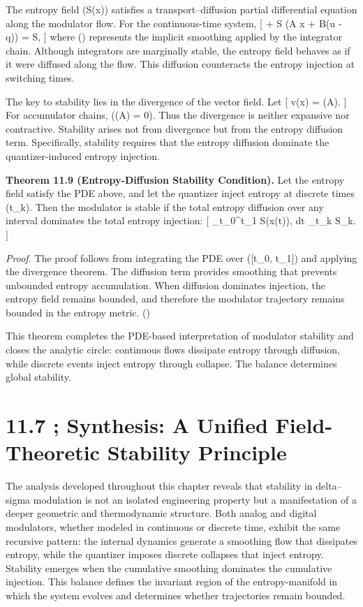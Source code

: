 The entropy field (S(x)) satisfies a transport–diffusion partial differential equation along the modulator flow. For the continuous-time system,
[
 + \nabla S \cdot (A x + B(u - q)) = \kappa \Delta S,
]
where (\kappa) represents the implicit smoothing applied by the integrator chain. Although integrators are marginally stable, the entropy field behaves as if it were diffused along the flow. This diffusion counteracts the entropy injection at switching times.

The key to stability lies in the divergence of the vector field. Let
[
\nabla \cdot v(x) = (A).
]
For accumulator chains, ((A) = 0). Thus the divergence is neither expansive nor contractive. Stability arises not from divergence but from the entropy diffusion term. Specifically, stability requires that the entropy diffusion dominate the quantizer-induced entropy injection.

\textbf{Theorem 11.9 (Entropy-Diffusion Stability Condition).}
Let the entropy field satisfy the PDE above, and let the quantizer inject entropy at discrete times (t_{k}). Then the modulator is stable if the total entropy diffusion over any interval dominates the total entropy injection:
[
\int_{t_{0}}^{t_{1}} \kappa \Delta S(x(t)), dt \ge \sum_{t_{k} \in [t_{0}, t_{1}]} \Delta S_{k}.
]

\textit{Proof.}
The proof follows from integrating the PDE over ([t_{0}, t_{1}]) and applying the divergence theorem. The diffusion term provides smoothing that prevents unbounded entropy accumulation. When diffusion dominates injection, the entropy field remains bounded, and therefore the modulator trajectory remains bounded in the entropy metric. \hfill(\square)

\bigskip

This theorem completes the PDE-based interpretation of modulator stability and closes the analytic circle: continuous flows dissipate entropy through diffusion, while discrete events inject entropy through collapse. The balance determines global stability.

\section*{11.7 ; Synthesis: A Unified Field-Theoretic Stability Principle}

The analysis developed throughout this chapter reveals that stability in delta–sigma modulation is not an isolated engineering property but a manifestation of a deeper geometric and thermodynamic structure. Both analog and digital modulators, whether modeled in continuous or discrete time, exhibit the same recursive pattern: the internal dynamics generate a smoothing flow that dissipates entropy, while the quantizer imposes discrete collapses that inject entropy. Stability emerges when the cumulative smoothing dominates the cumulative injection. This balance defines the invariant region of the entropy-manifold in which the system evolves and determines whether trajectories remain bounded.

